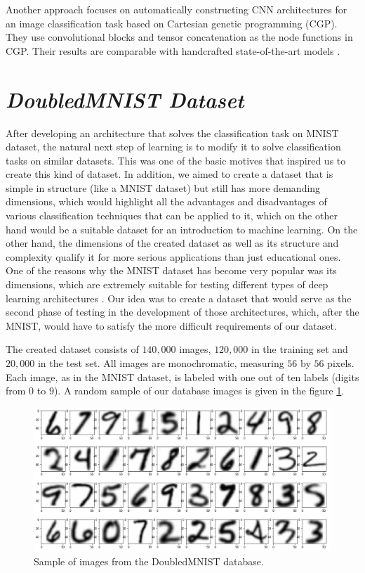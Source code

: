 \documentclass[eng]{simposium}
\begin{document}
Another approach focuses on automatically constructing CNN architectures for an image classification task based on Cartesian genetic programming (CGP). 
They use convolutional blocks and tensor concatenation as the node functions in CGP. Their results are comparable with handcrafted state-of-the-art models \cite{5}. 

\section{\textit{DoubledMNIST Dataset}} 

After developing an architecture that solves the classification task on MNIST dataset, the natural next step of learning is  
to modify it to solve classification tasks on similar datasets.  
This was one of the basic motives that inspired us to create this kind of dataset.  
In addition, we aimed to create a dataset that is simple in structure (like a MNIST dataset) but still has more demanding  
dimensions, which would highlight all the advantages and disadvantages of various classification techniques that can be  
applied to it, which on the other hand would be a suitable dataset for an introduction to machine learning.  
On the other hand, the dimensions of the created dataset as well as its structure and complexity qualify it for more  
serious applications than just educational ones.  
One of the reasons why the MNIST dataset has become very popular was its dimensions, which are extremely suitable for  
testing different types of deep learning architectures \cite{27}.  
Our idea was to create a dataset that would serve as the second phase of testing in the development of those architectures,  
which, after the MNIST, would have to satisfy the more difficult requirements of our dataset.  

The created dataset consists of $140,000$ images, $120,000$ in the training set and $20,000$ in the test set.  
All images are monochromatic, measuring $56$ by $56$ pixels.  
Each image, as in the MNIST dataset, is labeled with one out of ten labels (digits from $0$ to $9$).  
A random sample of our database images is given in the figure \ref{fig:nist_sample}.  

\begin{figure}[!ht] 
  \centering 
  \includegraphics[width=1\textwidth]{sample_from_nist.png} 
  \caption{Sample of images from the DoubledMNIST database.} 
  \label{fig:nist_sample} 
\end{figure} 
\end{document}
